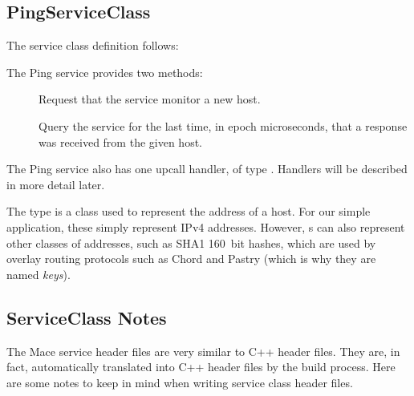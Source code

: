 \subsection{PingServiceClass}
\label{sec:pingserviceclass}

The service class definition 
follows:


The Ping service provides two methods:

\begin{description}

\item[] Request that the service monitor a new host.

\item[] Query the service for the last time, in
  epoch microseconds, that a response was received from the given
  host.

\end{description}

The Ping service also has one upcall handler, of type
.  Handlers will be described in more
detail later.

The type  is a class used to represent the address
of a host.  For our simple application, these simply represent IPv4
addresses.  However, s can also represent other
classes of addresses, such as SHA1 160~bit hashes, which are used by
overlay routing protocols such as Chord and Pastry (which is why they
are named \emph{keys}).


\subsection{ServiceClass Notes}
\label{sec:serviceclassnotes}

The Mace service header files are very similar to C++ header files.
They are, in fact, automatically translated into C++ header files by
the build process.  Here are some notes to keep in mind when writing
service class header files.

